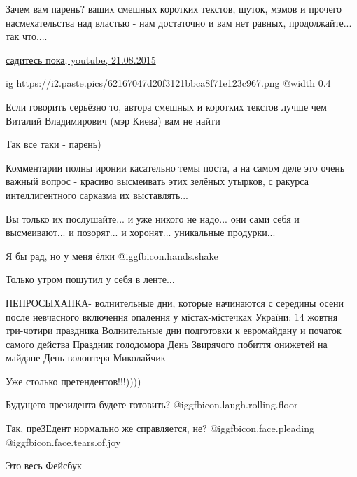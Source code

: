 \begin{itemize}

Зачем вам парень? ваших смешных коротких текстов, шуток, мэмов и прочего
насмехательства над властью - нам достаточно и вам нет равных, продолжайте...
так что....

\href{https://www.youtube.com/watch?v=JGjQDU4l-ew}{%
садитесь пока, youtube, 21.08.2015%
}

\ifcmt
  ig https://i2.paste.pics/62167047d20f3121bbca8f71e123c967.png
  @width 0.4
\fi


Если говорить серьёзно то, автора смешных и коротких текстов лучше чем Виталий
Владимирович (мэр Киева) вам не найти

Так все таки - парень)


Комментарии полны иронии касательно темы поста, а на самом деле это очень
важный вопрос - красиво высмеивать этих зелёных утырков, с ракурса
интеллигентного сарказма их выставлять...


Вы только их послушайте... и уже никого не надо... они сами себя и
высмеивают... и позорят... и хоронят... уникальные продурки...

Я бы рад, но у меня ёлки @igg{fbicon.hands.shake} 

Только утром пошутил у себя в ленте...


\obeycr
НЕПРОСЫХАНКА-
волнительные дни, которые начинаются с середины осени после невчасного включення опалення у містах-містечках України:
14 жовтня три-чотири праздника
Волнительные дни подготовки к евромайдану и початок самого действа
Праздник голодомора
День Звирячого побиття онижетей на майдане
День волонтера
Миколайчик
\restorecr


Уже столько претендентов!!!))))


Будущего президента будете готовить?  @igg{fbicon.laugh.rolling.floor} 


Так, преЗЕдент нормально же справляется, не?  @igg{fbicon.face.pleading}
@igg{fbicon.face.tears.of.joy} 

Это весь Фейсбук


\end{itemize}
